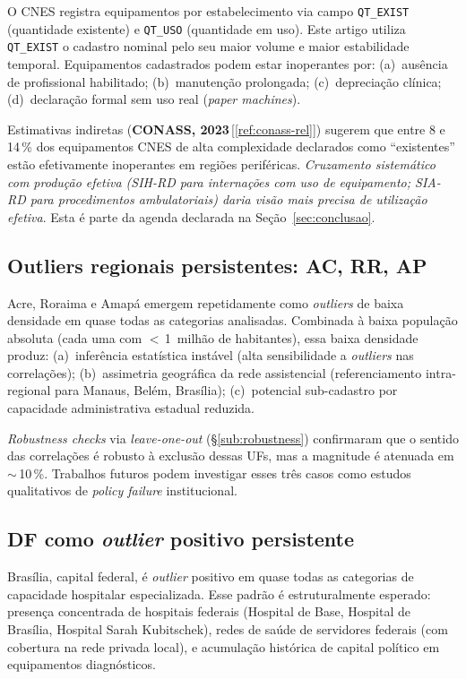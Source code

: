 \documentclass[12pt,a4paper,oneside]{article}
\begin{document}
O CNES registra equipamentos por estabelecimento via campo
\texttt{QT\_EXIST} (quantidade existente) e \texttt{QT\_USO}
(quantidade em uso). Este artigo utiliza \texttt{QT\_EXIST}
\textemdash{} o cadastro nominal \textemdash{} pelo seu maior
volume e maior estabilidade temporal. Equipamentos cadastrados
podem estar inoperantes por: (a)~ausência de profissional
habilitado; (b)~manutenção prolongada; (c)~depreciação clínica;
(d)~declaração formal sem uso real (\textit{paper machines}).

Estimativas indiretas (\textbf{CONASS, 2023}\,[\ref{ref:conass-rel}])
sugerem que entre 8 e 14\,\% dos equipamentos CNES de alta
complexidade declarados como ``existentes'' estão efetivamente
inoperantes em regiões periféricas. \textit{Cruzamento
sistemático com produção efetiva (SIH-RD para internações com
uso de equipamento; SIA-RD para procedimentos ambulatoriais)
daria visão mais precisa de utilização efetiva}. Esta é parte
da agenda declarada na Seção~\ref{sec:conclusao}.

\subsection{Outliers regionais persistentes: AC, RR, AP}\label{sub:caveat-outliers-norte}

Acre, Roraima e Amapá emergem repetidamente como \textit{outliers}
de baixa densidade em quase todas as categorias analisadas.
Combinada à baixa população absoluta (cada uma com $<$\,1~milhão
de habitantes), essa baixa densidade produz: (a)~inferência
estatística instável (alta sensibilidade a \textit{outliers}
nas correlações); (b)~assimetria geográfica da rede assistencial
(referenciamento intra-regional para Manaus, Belém, Brasília);
(c)~potencial sub-cadastro por capacidade administrativa
estadual reduzida.

\textit{Robustness checks} via \textit{leave-one-out}
(§\ref{sub:robustness}) confirmaram que o sentido das
correlações é robusto à exclusão dessas UFs, mas a magnitude é
atenuada em $\sim$\,10\,\%. Trabalhos futuros podem
investigar esses três casos como estudos qualitativos de
\textit{policy failure} institucional.

\subsection{DF como \textit{outlier} positivo persistente}\label{sub:caveat-df}

Brasília, capital federal, é \textit{outlier} positivo em quase
todas as categorias de capacidade hospitalar especializada.
Esse padrão é estruturalmente esperado: presença concentrada de
hospitais federais (Hospital de Base, Hospital de Brasília,
Hospital Sarah Kubitschek), redes de saúde de servidores
federais (com cobertura na rede privada local), e acumulação
histórica de capital político em equipamentos diagnósticos.
\end{document}
